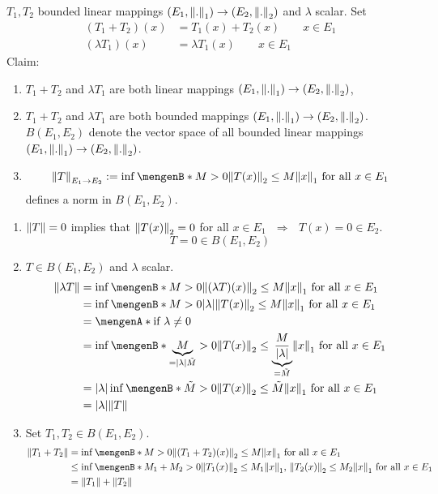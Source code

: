 \begin{satz}

	$T_1,T_2$ bounded linear mappings $(E_1,\norm{.}_1) \to (E_2,\norm{.}_2)$ and $\lambda$ scalar. Set
	\begin{align*}
		(T_1+T_2)(x) &= T_1(x) + T_2(x) \qquad x \in E_1 \\
		( \lambda T_1)(x) &= \lambda T_1(x) \qquad x \in E_1
	\end{align*}
	Claim:
	\begin{enumerate}[(1)]
		\item $T_1 + T_2$ and $\lambda T_1$ are both linear mappings $(E_1,\norm{.}_1) \to (E_2,\norm{.}_2)$,
		\item $T_1 + T_2$ and $\lambda T_1$ are both bounded mappings $(E_1,\norm{.}_1) \to (E_2,\norm{.}_2)$. \\
		$B(E_1,E_2)$ denote the vector space of all bounded linear mappings $(E_1,\norm{.}_1) \to (E_2,\norm{.}_2)$.
		\item \[
			\norm{T}_{E_1 \to E_2} := \inf \set[M > 0]{\norm{T(x)}_2 \leq M \norm{x}_1 \text{ for all }x \in E_1}
		\]
		defines a norm in $B(E_1,E_2)$.
	\end{enumerate}
\end{satz}
\begin{beweis}
	\begin{enumerate}[(1)]
		\item $\norm{T}=0$ implies that $\norm{T(x)}_2 = 0$ for all $x \in E_1$ $ \,\, \Rightarrow \,\, $ $T(x) = 0 \in E_2$.
		\[
			T = 0 \in B(E_1,E_2)
		\]
		\item $T \in B(E_1,E_2)$ and $\lambda$ scalar. 
		\begin{align*}
			\norm{\lambda T} &= \inf \set[M >0]{\norm{(\lambda T)(x)}_2 \leq M \norm{x}_1 \text{ for all }x \in E_1} \\
			&= \inf \set[M>0]{\abs{\lambda} \norm{T(x)}_2 \leq M \norm{x}_1 \text{ for all }x \in E_1} \\
			&= \set{\text{if }\lambda \neq 0} \\
			&= \inf \set[\underset{= \abs{\lambda} \tilde M}{\underbrace{M}}>0]{\norm{T(x)}_2 \leq \underset{= \tilde M}{\underbrace{\frac{M}{\abs{\lambda}}}}\norm{x}_1 \text{ for all }x \in E_1} \\
			&= \abs{\lambda} \inf \set[\tilde M >0]{ \norm{T(x)}_2 \leq \tilde M \norm{x}_1 \text{ for all }x \in E_1} \\
			&= \abs{\lambda} \norm{T}
		\end{align*}
		\item Set $T_1,T_2 \in B(E_1,E_2)$.
		\begin{align*}
			\norm{T_1+ T_2} &= \inf \set[M>0]{\norm{(T_1+T_2)(x)}_2 \leq M \norm{x}_1 \text{ for all }x \in E_1} \\
			&\leq \inf \set[M_1 + M_2>0]{\norm{T_1(x)}_2 \leq M_1 \norm{x}_1, \, \norm{T_2(x)}_2 \leq M_2 \norm{x}_1 \text{ for all }x \in E_1} \\
			&= \norm{T_1} + \norm{T_2}
		\end{align*}
	\end{enumerate}
\end{beweis}
